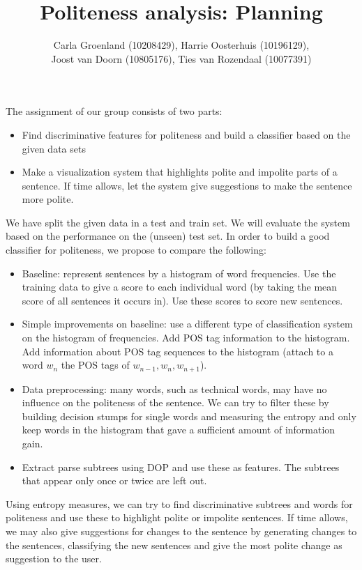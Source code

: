 \documentclass[11pt, english]{article}
\title{Politeness analysis: Planning}
\author{Carla Groenland (10208429), Harrie Oosterhuis (10196129), \\
Joost van Doorn (10805176), Ties van Rozendaal (10077391)}
\begin{document}
\maketitle
\noindent The assignment of our group consists of two parts:
\begin{itemize}
\item Find discriminative features for politeness and build a classifier based on the given data sets
\item Make a visualization system that highlights polite and impolite parts of a sentence. If time allows, let the system give suggestions to make the sentence more polite.
\end{itemize}
We have split the given data in a test and train set. We will evaluate the system based on the performance on the (unseen) test set.
In order to build a good classifier for politeness, we propose to compare the following:
\begin{itemize}
\item Baseline: represent sentences by a histogram of word frequencies. Use the training data to give a score to each individual word (by taking the mean score of all sentences it occurs in). Use these scores to score new sentences. 
\item Simple improvements on baseline: use a different type of classification system on the histogram of frequencies. Add POS tag information to the histogram. Add information about POS tag sequences to the histogram (attach to a word $w_n$ the POS tags of $w_{n-1},w_n,w_{n+1}$).
\item Data preprocessing: many words, such as technical words, may have no influence on the politeness of the sentence. We can try to filter these by building decision stumps for single words and measuring the entropy and only keep words in the histogram that gave a sufficient amount of information gain.
\item Extract parse subtrees using DOP and use these as features. The subtrees that appear only once or twice are left out. 
\end{itemize}
Using entropy measures, we can try to find discriminative subtrees and words for politeness and use these to highlight polite or impolite sentences. 
If time allows, we may also give suggestions for changes to the sentence by generating changes to the sentences, classifying the new sentences and give the most polite change as suggestion to the user.\\
\end{document}
